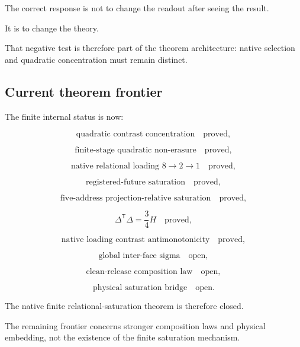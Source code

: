 The correct response is not to change the readout after seeing the
result.

It is to change the theory.

That negative test is therefore part of the theorem architecture:
native selection and quadratic concentration must remain distinct.

\subsection{Current theorem frontier}

The finite internal status is now:

\[
\text{quadratic contrast concentration}
\quad
\text{proved},
\]

\[
\text{finite-stage quadratic non-erasure}
\quad
\text{proved},
\]

\[
\text{native relational loading }8\to2\to1
\quad
\text{proved},
\]

\[
\text{registered-future saturation}
\quad
\text{proved},
\]

\[
\text{five-address projection-relative saturation}
\quad
\text{proved},
\]

\[
\Delta^{\mathsf T}\Delta=\frac34H
\quad
\text{proved},
\]

\[
\text{native loading contrast antimonotonicity}
\quad
\text{proved},
\]

\[
\text{global inter-face sigma}
\quad
\text{open},
\]

\[
\text{clean-release composition law}
\quad
\text{open},
\]

\[
\text{physical saturation bridge}
\quad
\text{open}.
\]

The native finite relational-saturation theorem is therefore closed.

The remaining frontier concerns stronger composition laws and physical
embedding, not the existence of the finite saturation mechanism.
